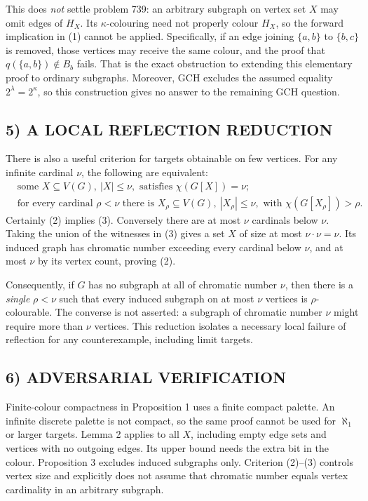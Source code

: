 This does \emph{not} settle problem 739: an arbitrary subgraph on vertex set $X$ may omit edges of $H_X$. Its $\kappa$-colouring need not properly colour $H_X$, so the forward implication in (1) cannot be applied. Specifically, if an edge joining $\{a,b\}$ to $\{b,c\}$ is removed, those vertices may receive the same colour, and the proof that $q(\{a,b\})\notin B_b$ fails. That is the exact obstruction to extending this elementary proof to ordinary subgraphs. Moreover, GCH excludes the assumed equality $2^\lambda=2^\kappa$, so this construction gives no answer to the remaining GCH question.

\subsection*{5) A LOCAL REFLECTION REDUCTION}
There is also a useful criterion for targets obtainable on few vertices. For any infinite cardinal $\nu$, the following are equivalent:
\[
\begin{split}
&\text{some }X\subseteq V(G),\ |X|\le\nu,\text{ satisfies }\chi(G[X])=\nu;\tag{2}\\
&\text{for every cardinal }\rho<\nu\text{ there is }X_\rho\subseteq V(G),\ |X_\rho|\le\nu,
\text{ with }\chi(G[X_\rho])>\rho.\tag{3}
\end{split}
\]
Certainly (2) implies (3). Conversely there are at most $\nu$ cardinals below $\nu$. Taking the union of the witnesses in (3) gives a set $X$ of size at most $\nu\cdot\nu=\nu$. Its induced graph has chromatic number exceeding every cardinal below $\nu$, and at most $\nu$ by its vertex count, proving (2).

Consequently, if $G$ has no subgraph at all of chromatic number $\nu$, then there is a \emph{single} $\rho<\nu$ such that every induced subgraph on at most $\nu$ vertices is $\rho$-colourable. The converse is not asserted: a subgraph of chromatic number $\nu$ might require more than $\nu$ vertices. This reduction isolates a necessary local failure of reflection for any counterexample, including limit targets.

\subsection*{6) ADVERSARIAL VERIFICATION}
Finite-colour compactness in Proposition 1 uses a finite compact palette. An infinite discrete palette is not compact, so the same proof cannot be used for $\aleph_1$ or larger targets. Lemma 2 applies to all $X$, including empty edge sets and vertices with no outgoing edges. Its upper bound needs the extra bit in the colour. Proposition 3 excludes induced subgraphs only. Criterion (2)--(3) controls vertex size and explicitly does not assume that chromatic number equals vertex cardinality in an arbitrary subgraph.

